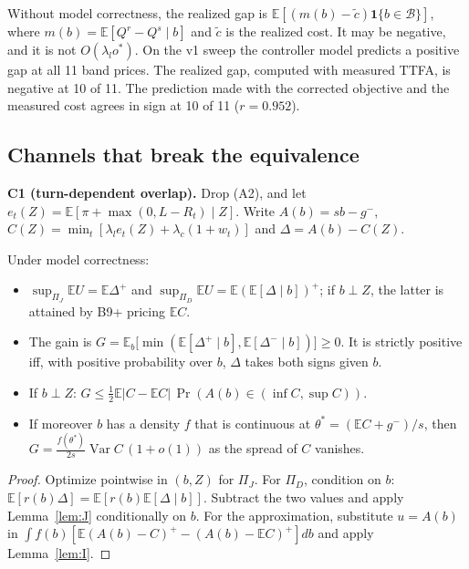 \begin{remark}
Without model correctness, the realized gap is
$\mathbb E[(m(b)-\tilde c)\mathbf 1\{b\in\mathcal B\}]$, where
$m(b)=\mathbb E[Q^{r}-Q^{s}\mid b]$ and $\tilde c$ is the realized cost. It may
be negative, and it is not $O(\lambda_lo^{*})$. On the v1 sweep the
controller model predicts a positive gap at all 11 band prices. The realized
gap, computed with measured TTFA, is negative at 10 of 11. The prediction made
with the corrected objective and the measured cost agrees in sign at 10 of 11
($r=0.952$).
\end{remark}

\subsection{Channels that break the equivalence}
\textbf{C1 (turn-dependent overlap).} Drop (A2), and let
$e_t(Z)=\mathbb E[\pi+\max(0,L-R_t)\mid Z]$. Write $A(b)=sb-g^{-}$,
$C(Z)=\min_t[\lambda_le_t(Z)+\lambda_c(1+w_t)]$ and $\Delta=A(b)-C(Z)$.

\begin{proposition}[C1]\label{prop:c1}
Under model correctness:
\begin{itemize}
\item $\sup_{\Pi_J}\mathbb EU=\mathbb E\Delta^{+}$ and
$\sup_{\Pi_D}\mathbb EU=\mathbb E(\mathbb E[\Delta\mid b])^{+}$; if $b\perp Z$,
the latter is attained by B9+ pricing $\mathbb EC$.
\item The gain is
$G=\mathbb E_b\big[\min(\mathbb E[\Delta^{+}\mid b],\mathbb E[\Delta^{-}\mid b])\big]\ge0$.
It is strictly positive iff, with positive probability over $b$, $\Delta$
takes both signs given $b$.
\item If $b\perp Z$:
$G\le\tfrac12\mathbb E|C-\mathbb EC|\,\Pr(A(b)\in(\inf C,\sup C))$.
\item If moreover $b$ has a density $f$ that is continuous at
$\theta^{*}=(\mathbb EC+g^{-})/s$, then
$G=\frac{f(\theta^{*})}{2s}\operatorname{Var}C\,(1+o(1))$ as the spread of
$C$ vanishes.
\end{itemize}
\end{proposition}
\begin{proof}
Optimize pointwise in $(b,Z)$ for $\Pi_J$. For $\Pi_D$, condition on $b$:
$\mathbb E[r(b)\Delta]=\mathbb E[r(b)\mathbb E[\Delta\mid b]]$. Subtract the two
values and apply Lemma~\ref{lem:J} conditionally on $b$. For the
approximation, substitute $u=A(b)$ in
$\int f(b)[\mathbb E(A(b)-C)^{+}-(A(b)-\mathbb EC)^{+}]db$ and apply
Lemma~\ref{lem:I}.
\end{proof}

